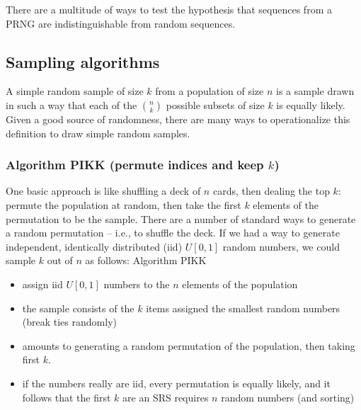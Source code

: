 \documentclass[12pt]{article}
\newcommand{\todo}[1]{{\color{red}{TO DO: \sc #1}}}
\begin{document}
There are a multitude of ways to test the hypothesis that sequences from a PRNG are indistinguishable 
from random sequences.
\todo{list types of tests + citations: L'Ecuyer Simard TestU01 (2007),  Knuth (1969), Marsaglia DIEHARD tests (1968), NIST tests

\begin{itemize}
\item Two notions of uniformity: 1) uniformly distributed within a sequence with a fixed starting state, 2) the set of sequences of length $t$ that can be hit by the PRNG should be uniformly distributed among the set of all sequences of length $t$ -- this gets at the SRS problem
\item Make sure to define terms like $k$-distributed
\end{itemize}
}

\subsection{Sampling algorithms}
A simple random sample of size $k$ from a population of size $n$ is a sample drawn in such a way that each of the ${n \choose k}$ possible subsets of size $k$ is equally likely.
Given a good source of randomness, there are many ways to operationalize this definition to draw simple random samples.
\subsubsection{Algorithm PIKK (permute indices and keep $k$)}
One basic approach is like shuffling a deck of $n$ cards, then dealing the top $k$: permute the population at random, then take the first $k$ elements of the permutation to be the sample.
There are a number of standard ways to generate a random permutation -- i.e., to shuffle the deck.
If we had a way to generate independent, identically distributed (iid) $U[0,1]$ random numbers, we could sample $k$ out of $n$ as follows:
\todo{create an algorithm environment}
Algorithm PIKK
\begin{itemize}
\item assign iid $U[0,1]$ numbers to the $n$ elements of the population
\item the sample consists of the $k$ items assigned the smallest random numbers (break ties randomly)
\item amounts to generating a random permutation of the population, then taking first $k$.
\item if the numbers really are iid, every permutation is equally likely, and it follows that the first $k$ are an SRS
requires $n$ random numbers (and sorting)
\end{itemize}
\end{document}
